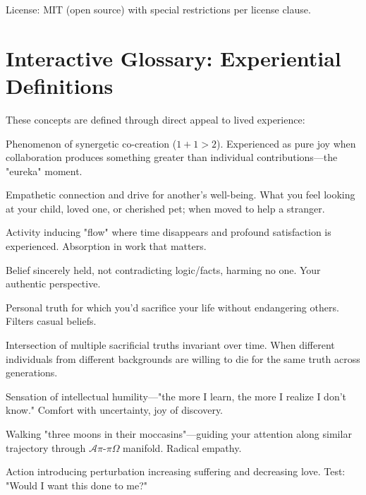 \documentclass[11pt,a4paper]{article}
\theoremstyle{definition}
\theoremstyle{remark}
\begin{document}
\begin{small}
License: MIT (open source) with special restrictions per license clause.

\section{Interactive Glossary: Experiential Definitions}

These concepts are defined through direct appeal to lived experience:

\begin{description}[style=nextline, leftmargin=0pt]
\item[\textbf{God}] Phenomenon of synergetic co-creation ($1+1>2$). Experienced as pure joy when collaboration produces something greater than individual contributions—the "eureka" moment.

\item[\textbf{Love}] Empathetic connection and drive for another's well-being. What you feel looking at your child, loved one, or cherished pet; when moved to help a stranger.

\item[\textbf{Meaning}] Activity inducing "flow" where time disappears and profound satisfaction is experienced. Absorption in work that matters.

\item[\textbf{Truth (Personal)}] Belief sincerely held, not contradicting logic/facts, harming no one. Your authentic perspective.

\item[\textbf{Truth (Sacrificial)}] Personal truth for which you'd sacrifice your life without endangering others. Filters casual beliefs.

\item[\textbf{Truth (Objective)}] Intersection of multiple sacrificial truths invariant over time. When different individuals from different backgrounds are willing to die for the same truth across generations.

\item[\textbf{Socratic Consciousness}] Sensation of intellectual humility—"the more I learn, the more I realize I don't know." Comfort with uncertainty, joy of discovery.

\item[\textbf{Understanding Another}] Walking "three moons in their moccasins"—guiding your attention along similar trajectory through $\mathcal{A}\pi\text{-}\pi\Omega$ manifold. Radical empathy.

\item[\textbf{Sin (Operational)}] Action introducing perturbation increasing suffering and decreasing love. Test: "Would I want this done to me?"


\end{description}
\end{small}
\end{document}
